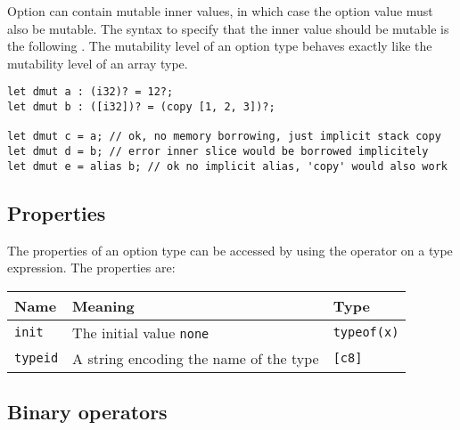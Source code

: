 Option can contain mutable inner values, in which case the option value must
also be mutable. The syntax to specify that the inner value should be mutable is
the following . The mutability level of an option type
behaves exactly like the mutability level of an array type.

\begin{lstlisting}[style=coloredverbatim]
let dmut a : (i32)? = 12?;
let dmut b : ([i32])? = (copy [1, 2, 3])?;

let dmut c = a; // ok, no memory borrowing, just implicit stack copy
let dmut d = b; // error inner slice would be borrowed implicitely
let dmut e = alias b; // ok no implicit alias, 'copy' would also work
\end{lstlisting}

\subsection{Properties}

The properties of an option type can be accessed by using the \token{::} operator on a type expression. The properties are:

\begin{center}\begin{adjustbox}{max width=\linewidth}
  \begin{tabular}{|l|ll|}
    \hline
    Name & Meaning & Type\\
    \hline
    \hline
    \texttt{init} & The initial value \texttt{none} & \texttt{typeof(x)}\\
    \hline
    \texttt{typeid} & A string encoding the name of the type & \texttt{[c8]} \\
    \hline
  \end{tabular}
\end{adjustbox}\end{center}

\subsection{Binary operators}

